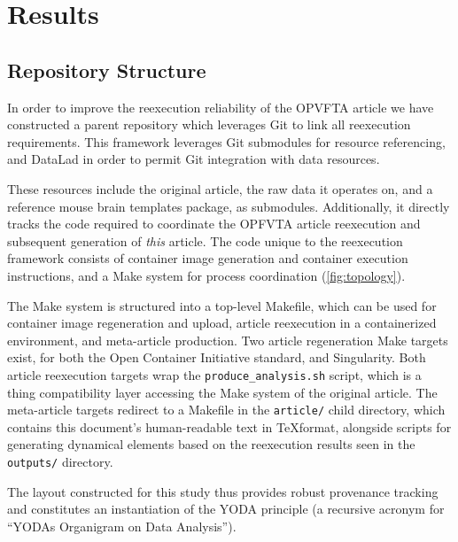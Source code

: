 \section{Results}

\subsection{Repository Structure}
In order to improve the reexecution reliability of the OPVFTA article we have constructed a parent repository which leverages Git to link all reexecution requirements.
This framework leverages Git submodules for resource referencing, and DataLad \cite{datalad} in order to permit Git integration with data resources.

These resources include the original article, the raw data it operates on, and a reference mouse brain templates package, as submodules.
Additionally, it directly tracks the code required to coordinate the OPFVTA article reexecution and subsequent generation of \emph{this} article.
The code unique to the reexecution framework consists of container image generation and container execution instructions, and a Make system for process coordination (\cref{fig:topology}).

The Make system is structured into a top-level Makefile, which can be used for container image regeneration and upload, article reexecution in a containerized environment, and meta-article production.
Two article regeneration Make targets exist, for both the Open Container Initiative standard, and Singularity.
Both article reexecution targets wrap the \texttt{produce\_analysis.sh} script, which is a thing compatibility layer accessing the Make system of the original article.
The meta-article targets redirect to a Makefile in the \texttt{article/} child directory, which contains this document's human-readable text in \TeX format, alongside scripts for generating dynamical elements based on the reexecution results seen in the \texttt{outputs/} directory.

The layout constructed for this study thus provides robust provenance tracking and constitutes an instantiation of the YODA principle (a recursive acronym for “YODAs Organigram on Data Analysis”).

